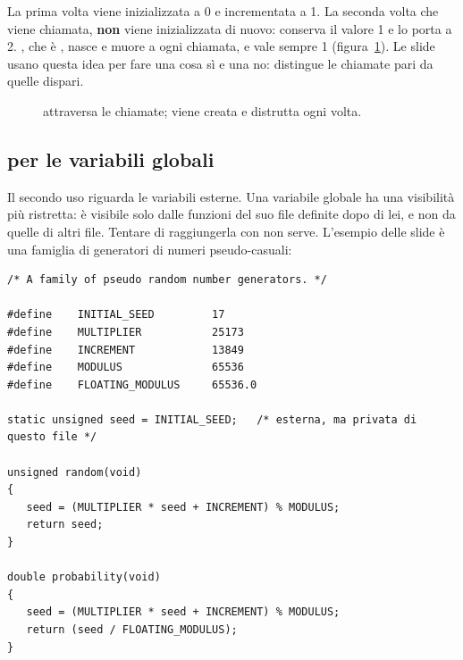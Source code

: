 La prima volta  viene inizializzata a 0 e incrementata a 1. La
seconda volta che  viene chiamata,  \textbf{non} viene
inizializzata di nuovo: conserva il valore 1 e lo porta a 2. ,
che è , nasce e muore a ogni chiamata, e vale sempre 1
(figura~\ref{fig:statica}). Le slide usano questa idea per fare una cosa sì
e una no:  distingue le chiamate pari da quelle
dispari.

\begin{figure}[H]
  \centering
  \caption{ attraversa le chiamate;  viene creata e
           distrutta ogni volta.}
  \label{fig:statica}
\end{figure}

\subsection{ per le variabili globali}

Il secondo uso riguarda le variabili esterne. Una variabile globale
 ha una visibilità più ristretta: è visibile solo dalle
funzioni del suo file definite dopo di lei, e non da quelle di altri file.
Tentare di raggiungerla con  non serve. L'esempio delle slide è
una famiglia di generatori di numeri pseudo-casuali:

\begin{lstlisting}[style=c, name=random.c]
/* A family of pseudo random number generators. */

#define    INITIAL_SEED         17
#define    MULTIPLIER           25173
#define    INCREMENT            13849
#define    MODULUS              65536
#define    FLOATING_MODULUS     65536.0

static unsigned seed = INITIAL_SEED;   /* esterna, ma privata di questo file */

unsigned random(void)
{
   seed = (MULTIPLIER * seed + INCREMENT) % MODULUS;
   return seed;
}

double probability(void)
{
   seed = (MULTIPLIER * seed + INCREMENT) % MODULUS;
   return (seed / FLOATING_MODULUS);
}
\end{lstlisting}

